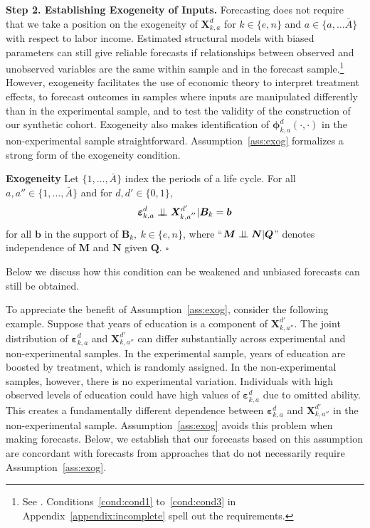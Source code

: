 \begin{figure}
\end{figure}

\textbf{Step 2. Establishing Exogeneity of Inputs.} Forecasting does not require that we take a position on the exogeneity of $\bm{X}^d_{k,a}$ for $k \in \{e,n\}$ and $a \in \{ a, \ldots \bar{A} \}$ with respect to labor income. Estimated structural models with biased parameters can still give reliable forecasts if relationships between observed and unobserved variables are the same within sample and in the forecast sample.\footnote{See \cite{Liu-etal-2016-USC-Data-Models}.  Conditions~\ref{cond:cond1} to~\ref{cond:cond3} in Appendix~\ref{appendix:incomplete} spell out the requirements.} However, exogeneity facilitates the use of economic theory to interpret treatment effects, to forecast outcomes in samples where inputs are manipulated differently than in the experimental sample, and to test the validity of the construction of our synthetic cohort. Exogeneity also makes identification of $\bm{\phi}^d_{k,a}\left( \cdot, \cdot \right)$ in the non-experimental sample straightforward. Assumption~\ref{ass:exog} formalizes a strong form of the exogeneity condition.

\onehalfspacing
\begin{assumption}\label{ass:exog} \textbf{Exogeneity}
Let $\{ 1, \ldots, \bar{A} \}$ index the periods of a life cycle. For all $a, a'' \in \{ 1, \ldots, \bar{A} \}$ and for $d, d' \in \{0,1\}$,
\begin{equation}
\bm{\varepsilon}^d_{k,a} \perp\!\!\!\perp \bm{X}^{d^{\prime}}_{k,a^{''}} | \bm{B}_k = \bm{b}
\end{equation}
for all $\bm{b}$ in the support of $\bm{B}_k, \: k \in \{e,n\}$, where ``$\bm{M} \perp\!\!\!\perp \bm{N}|\bm{Q}$'' denotes independence of $\bm{M}$ and $\bm{N}$ given $\bm{Q}$. $\square$
\end{assumption}
\doublespacing
Below we discuss how this condition can be weakened and unbiased forecasts can still be obtained.

To appreciate the benefit of Assumption~\ref{ass:exog}, consider the following example. Suppose that years of education is a component of $\bm{X}^{d'}_{k,{a''}}$. The joint distribution of $\bm{\varepsilon}_{k,a}^d$ and $\bm{X}^{d'}_{k,{a''}}$ can differ substantially across experimental and non-experimental samples. In the experimental sample, years of education are boosted by treatment, which is randomly assigned. In the non-experimental samples, however, there is no experimental variation. Individuals with high observed levels of education could have high values of $\bm{\varepsilon}_{k,a}^d$ due to omitted ability. This creates a fundamentally different dependence between $\bm{\varepsilon}_{k,a}^d$ and $\bm{X}_{k,{a''}}^{d'}$ in the non-experimental sample. Assumption~\ref{ass:exog} avoids this problem when making forecasts. Below, we establish that our forecasts based on this assumption are concordant with forecasts from approaches that do not necessarily require Assumption~\ref{ass:exog}.

